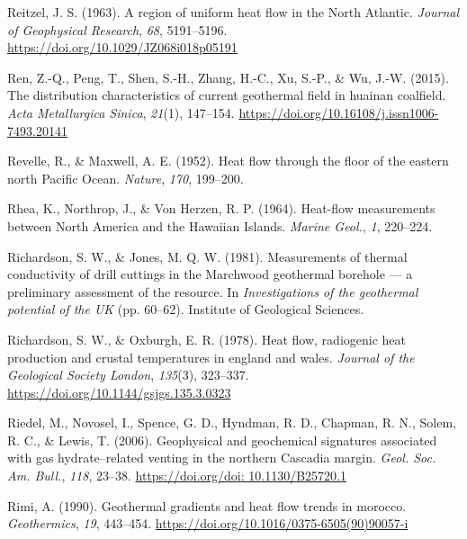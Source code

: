 \begin{CSLReferences}{1}{1}
\leavevmode{}%
Reitzel, J. S. (1963). A region of uniform heat flow in the {North Atlantic}. \emph{Journal of Geophysical Research}, \emph{68}, 5191--5196. \url{https://doi.org/10.1029/JZ068i018p05191}

\leavevmode{}%
Ren, Z.-Q., Peng, T., Shen, S.-H., Zhang, H.-C., Xu, S.-P., \& Wu, J.-W. (2015). The distribution characteristics of current geothermal field in huainan coalfield. \emph{Acta Metallurgica Sinica}, \emph{21}(1), 147--154. \url{https://doi.org/10.16108/j.issn1006-7493.20141}

\leavevmode{}%
Revelle, R., \& Maxwell, A. E. (1952). Heat flow through the floor of the eastern north {Pacific Ocean}. \emph{Nature}, \emph{170}, 199--200.

\leavevmode{}%
Rhea, K., Northrop, J., \& Von Herzen, R. P. (1964). Heat-flow measurements between {North America and the Hawaiian Islands}. \emph{Marine Geol.}, \emph{1}, 220--224.

\leavevmode{}%
Richardson, S. W., \& Jones, M. Q. W. (1981). Measurements of thermal conductivity of drill cuttings in the {Marchwood} geothermal borehole --- a preliminary assessment of the resource. In \emph{Investigations of the geothermal potential of the UK} (pp. 60--62). Institute of Geological Sciences.

\leavevmode{}%
Richardson, S. W., \& Oxburgh, E. R. (1978). Heat flow, radiogenic heat production and crustal temperatures in england and wales. \emph{Journal of the Geological Society London}, \emph{135}(3), 323--337. \url{https://doi.org/10.1144/gsjgs.135.3.0323}

\leavevmode{}%
Riedel, M., Novosel, I., Spence, G. D., Hyndman, R. D., Chapman, R. N., Solem, R. C., \& Lewis, T. (2006). Geophysical and geochemical signatures associated with gas {hydrate--related} venting in the northern {Cascadia} margin. \emph{Geol. Soc. Am. Bull.}, \emph{118}, 23--38. \href{https://doi.org/doi:\%2010.1130/B25720.1}{https://doi.org/doi: 10.1130/B25720.1}

\leavevmode{}%
Rimi, A. (1990). Geothermal gradients and heat flow trends in morocco. \emph{Geothermics}, \emph{19}, 443--454. \url{https://doi.org/10.1016/0375-6505(90)90057-i}


\end{CSLReferences}
